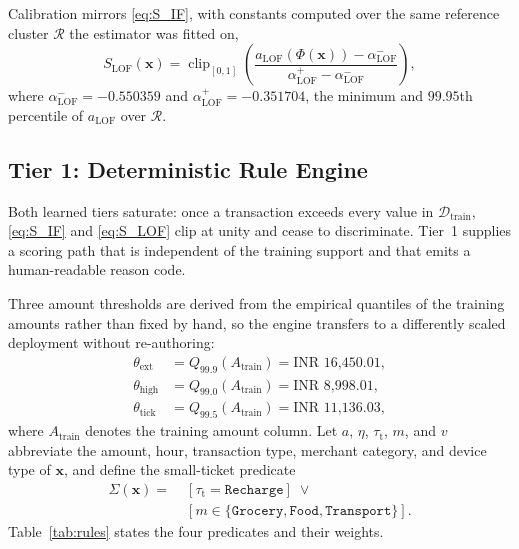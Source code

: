 \documentclass[conference]{IEEEtran}
\newcommand{\INR}[1]{\mbox{INR~#1}}
\begin{document}
Calibration mirrors \eqref{eq:S_IF}, with constants computed over the
same reference cluster $\mathcal{R}$ the estimator was fitted on,
\begin{equation}
S_{\mathrm{LOF}}(\mathbf{x}) =
\operatorname{clip}_{[0,1]}\!\left(
\frac{a_{\mathrm{LOF}}(\Phi(\mathbf{x})) - \alpha^{-}_{\mathrm{LOF}}}
     {\alpha^{+}_{\mathrm{LOF}} - \alpha^{-}_{\mathrm{LOF}}}
\right),
\label{eq:S_LOF}
\end{equation}
where $\alpha^{-}_{\mathrm{LOF}} = -0.550359$ and
$\alpha^{+}_{\mathrm{LOF}} = -0.351704$, the minimum and $99.95$th
percentile of $a_{\mathrm{LOF}}$ over $\mathcal{R}$.

\subsection{Tier 1: Deterministic Rule Engine}
\label{subsec:rules}

Both learned tiers saturate: once a transaction exceeds every value in
$\mathcal{D}_{\mathrm{train}}$, \eqref{eq:S_IF} and \eqref{eq:S_LOF}
clip at unity and cease to discriminate. Tier~1 supplies a scoring path
that is independent of the training support and that emits a
human-readable reason code.

Three amount thresholds are derived from the empirical quantiles of the
training amounts rather than fixed by hand, so the engine transfers to
a differently scaled deployment without re-authoring:
\begin{align}
\theta_{\mathrm{ext}}  &= Q_{99.9}(A_{\mathrm{train}}) = \INR{16{,}450.01}, \label{eq:th1}\\
\theta_{\mathrm{high}} &= Q_{99.0}(A_{\mathrm{train}}) = \INR{8{,}998.01},  \label{eq:th2}\\
\theta_{\mathrm{tick}} &= Q_{99.5}(A_{\mathrm{train}}) = \INR{11{,}136.03}, \label{eq:th3}
\end{align}
where $A_{\mathrm{train}}$ denotes the training amount column. Let $a$,
$\eta$, $\tau_{\mathrm{t}}$, $m$, and $v$ abbreviate the amount, hour,
transaction type, merchant category, and device type of $\mathbf{x}$,
and define the small-ticket predicate
\begin{equation}
\begin{split}
\Sigma(\mathbf{x}) =\;&
\left[\tau_{\mathrm{t}} = \texttt{Recharge}\right] \;\vee\\
&\left[m \in \{\texttt{Grocery},\texttt{Food},\texttt{Transport}\}\right].
\end{split}
\label{eq:smallticket}
\end{equation}
Table~\ref{tab:rules} states the four predicates and their weights.
\end{document}
